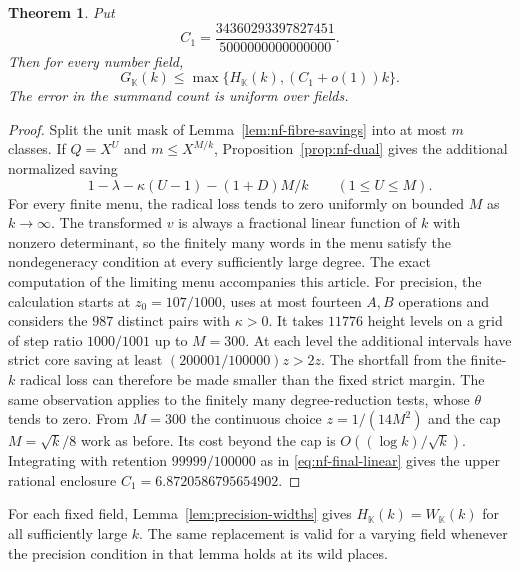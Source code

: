 \documentclass[11pt,letterpaper]{article}
\newtheorem{theorem}{Theorem}[section]
\theoremstyle{definition}
\numberwithin{equation}{section}
\begin{document}
\begin{theorem}\label{thm:nf-dual-linear}
Put
\[
          C_1=\frac{34360293397827451}{5000000000000000}.
\]
Then for every number field,
\begin{equation}\label{eq:nf-dual-final}
 G_{\mathbb K}(k)\le
       \max\{H_{\mathbb K}(k),(C_1+o(1))k\}.
\end{equation}
The error in the summand count is uniform over fields.
\end{theorem}
\begin{proof}
Split the unit mask of Lemma~\ref{lem:nf-fibre-savings} into at most
$m$ classes. If $Q=X^U$ and $m\le X^{M/k}$, Proposition~\ref{prop:nf-dual}
gives the additional normalized saving
\[
     1-\lambda-\kappa(U-1)-(1+D)M/k\qquad(1\le U\le M).
\]
For every finite menu, the radical loss tends to zero uniformly
on bounded $M$ as $k\to\infty$. The transformed $v$ is always
a fractional linear function of $k$ with nonzero determinant, so
the finitely many words in the menu satisfy the nondegeneracy
condition at every sufficiently large degree. The exact computation of the limiting menu accompanies this article.
For precision, the calculation starts at $z_0=107/1000$,
uses at most fourteen $A,B$ operations and considers the $987$
distinct pairs with $\kappa>0$. It takes $11776$ height levels on
a grid of step ratio $1000/1001$ up to $M=300$. At each
level the additional intervals have strict core saving at least
$(200001/100000)z>2z$. The shortfall from the finite-$k$ radical
loss can therefore be made smaller than the fixed strict margin.
The same observation applies to the finitely many degree-reduction
tests, whose $\theta$ tends to zero. From $M=300$ the continuous
choice $z=1/(14M^2)$ and the cap $M=\sqrt k/8$ work as before.
Its cost beyond the cap is $O((\log k)/\sqrt k)$. Integrating with
retention $99999/100000$ as in \eqref{eq:nf-final-linear} gives the
upper rational enclosure $C_1=6.8720586795654902$.
\end{proof}
For each fixed field, Lemma~\ref{lem:precision-widths} gives
$H_{\mathbb K}(k)=W_{\mathbb K}(k)$ for all sufficiently large $k$.
The same replacement is valid for a varying field whenever the
precision condition in that lemma holds at its wild places.
\end{document}
